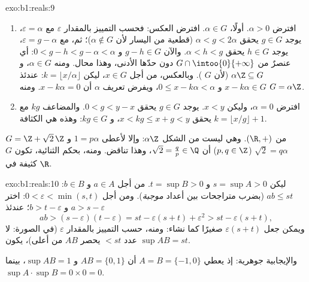\begin{solution}{exo:b1:reals:9}
\begin{enumerate}
  \item افترض $\alpha > 0$. أولًا، $\alpha \in G$. افترض العكس: فحسب
        التمييز بالمقدار $\varepsilon$  مع
        $\varepsilon = \alpha$، يوجد $g \in G$ يحقق $\alpha < g <
        2\alpha$ (قطعية من اليسار لأن $\alpha \notin G$)؛ ثم،
        مع $\varepsilon = g - \alpha$، يوجد $h \in G$ يحقق
        $\alpha < h < g$. والآن $g - h \in G$ و $0 < g - h < g -
        \alpha < \alpha$: أي عنصرٌ من $G \cap \intoo{0}{+\infty}$
        دون حدّها الأدنى، وهذا محال. ومنه $\alpha \in G$، و $\alpha\Z
        \subseteq G$ (لأن $G$ ). وبالعكس، من أجل $x \in G$، ليكن
        $k = \lfloor x/\alpha \rfloor$: عندئذ $x - k\alpha \in G$ و
        $0 \leq x - k\alpha < \alpha$، ويفرض تعريف $\alpha$
        أن $x - k\alpha = 0$. ومنه $G = \alpha\Z$.
  \item افترض $\alpha = 0$، وليكن $x < y$. يوجد $g \in G$
        يحقق $0 < g < y - x$. والمضاعف $kg$ مع $k = \lfloor x/g
        \rfloor + 1$ يحقق $x < kg \leq x + g < y$، و $kg \in
        G$: وهذه هي الكثافة.
\end{enumerate}
 $G = \Z + \sqrt 2\,\Z$  من $(\R, +)$. وهي ليست من
الشكل $\alpha\Z$: وإلا لأعطى $1 = p\alpha$ و $\sqrt 2 = q\alpha$
($p, q \in \Z$) أن $\sqrt 2 = \frac qp \in \Q$،
وهذا تناقض. ومنه، بحكم الثنائية، تكون $G$ كثيفة في $\R$.
\end{solution}

\begin{solution}{exo:b1:reals:10}
ليكن $s = \sup A > 0$ و $t = \sup B > 0$. من أجل $a \in A$ و $b \in B$: $ab
\leq st$ (بضرب متراجحات بين أعداد \emph{موجبة}).
ومن أجل $0 < \varepsilon < \min(s, t)$: اختر $a > s - \varepsilon$ و
$b > t - \varepsilon$؛ عندئذ
\[
ab > (s - \varepsilon)(t - \varepsilon)
= st - \varepsilon(s + t) + \varepsilon^2
> st - \varepsilon (s + t),
\]
ويمكن جعل $\varepsilon(s+t)$ صغيرًا كما نشاء: ومنه، حسب
التمييز بالمقدار $\varepsilon$ (في الصورة: لا عدد $< st$ يحصر
$AB$ من أعلى)، يكون $\sup AB = st$.

والإيجابية جوهرية: إذ يعطي $A = B = \{-1, 0\}$ أن $AB = \{0, 1\}$ و
$\sup AB = 1$، بينما $\sup A \cdot \sup B = 0 \times 0 = 0$.
\end{solution}

